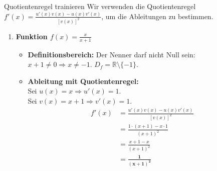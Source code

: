 \begin{loesungsumgebung}{Quotientenregel trainieren}
Wir verwenden die Quotientenregel $f'(x) = \frac{u'(x)v(x) - u(x)v'(x)}{[v(x)]^2}$, um die Ableitungen zu bestimmen.

\begin{enumerate}[label=(\alph*)]
    \item \textbf{Funktion $f(x) = \frac{x}{x+1}$}
    \begin{itemize}
        \item \textbf{Definitionsbereich:} Der Nenner darf nicht Null sein: $x+1 \neq 0 \Rightarrow x \neq -1$. $D_f = \mathbb{R} \setminus \{-1\}$.
        \item \textbf{Ableitung mit Quotientenregel:} \\
        Sei $u(x) = x \Rightarrow u'(x) = 1$. \\
        Sei $v(x) = x+1 \Rightarrow v'(x) = 1$.
        \begin{align*}
        f'(x) &= \frac{u'(x)v(x) - u(x)v'(x)}{[v(x)]^2} \\
              &= \frac{1 \cdot (x+1) - x \cdot 1}{(x+1)^2} \\
              &= \frac{x+1-x}{(x+1)^2} \\
              &= \mathbf{\frac{1}{(x+1)^2}}
        \end{align*}
    \end{itemize}


\end{enumerate}
\end{loesungsumgebung}

